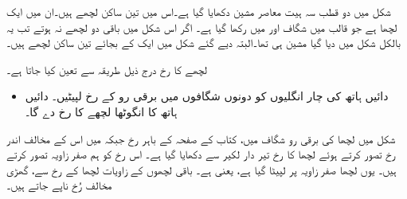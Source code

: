 شکل   میں دو قطب  سہ ہیت معاصر مشین دکھایا گیا ہے۔اس میں تین ساکن لچھے ہیں۔ان میں ایک لچھا  ہے جو قالب میں  شگاف   اور  میں رکھا گیا ہے۔ اگر اس شکل میں باقی دو لچھے نہ ہوتے تب یہ بالکل شکل   میں دیا گیا مشین ہی تھا۔البتہ دیے گئے شکل میں ایک کے بجائے تین ساکن لچھے ہیں۔

لچھے کا رخ درج ذیل طریقہ سے تعین کیا جاتا ہے۔

\begin{itemize}
\item
دائیں ہاتھ کی چار انگلیوں کو دونوں شگافوں میں برقی رو کے رخ لپیٹیں۔ دائیں ہاتھ کا انگوٹھا لچھے کا رخ دے گا۔
\end{itemize}

 شکل  میں  لچھا    کی  برقی رو  شگاف  میں،  کتاب کے صفحہ کے  باہر رخ جبکہ    میں اس کے مخالف اندر رخ تصور کرتے ہوئے  لچھا  کا رخ تیر دار لکیر سے دکھایا گیا ہے۔ اس رخ کو ہم صفر زاویہ تصور کرتے ہیں۔ یوں لچھا   صفر زاویہ پر لپیٹا گیا ہے، یعنی  ہے۔ باقی لچھوں کے زاویات   لچھا  کے رخ سے، گھڑی  مخالف رُخ ناپے جاتے ہیں۔

